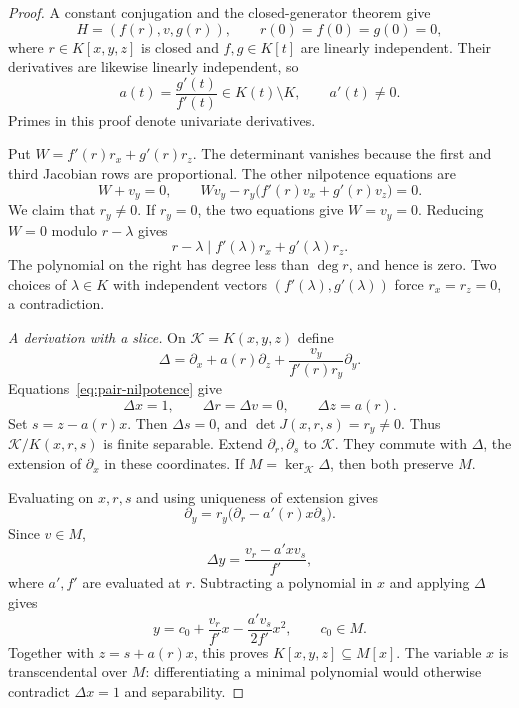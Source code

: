 \documentclass[10pt,a4paper]{amsart}
\begin{document}
\begin{proof}
A constant conjugation and the closed-generator theorem give
\begin{equation}\label{eq:pair-form}
 H=(f(r),v,g(r)),\qquad r(0)=f(0)=g(0)=0,
\end{equation}
where $r\in K[x,y,z]$ is closed and $f,g\in K[t]$ are linearly independent. Their derivatives are likewise linearly independent, so
\begin{equation}\label{eq:a-ratio}
 a(t)=\frac{g'(t)}{f'(t)}\in K(t)\setminus K,\qquad a'(t)\neq0.
\end{equation}
Primes in this proof denote univariate derivatives.

Put $W=f'(r)r_x+g'(r)r_z$. The determinant vanishes because the first and third Jacobian rows are proportional. The other nilpotence equations are
\begin{equation}\label{eq:pair-nilpotence}
 W+v_y=0,\qquad Wv_y-r_y\bigl(f'(r)v_x+g'(r)v_z\bigr)=0.
\end{equation}
We claim that $r_y\neq0$. If $r_y=0$, the two equations give $W=v_y=0$. Reducing $W=0$ modulo $r-\lambda$ gives
\[
 r-\lambda\mid f'(\lambda)r_x+g'(\lambda)r_z.
\]
The polynomial on the right has degree less than $\deg r$, and hence is zero. Two choices of $\lambda\in K$ with independent vectors $(f'(\lambda),g'(\lambda))$ force $r_x=r_z=0$, a contradiction.

\smallskip\noindent\emph{A derivation with a slice.}
On $\mathcal K=K(x,y,z)$ define
\begin{equation}\label{eq:delta}
 \Delta=\partial_x+a(r)\partial_z+\frac{v_y}{f'(r)r_y}\partial_y.
\end{equation}
Equations~\eqref{eq:pair-nilpotence} give
\[
 \Delta x=1,\qquad \Delta r=\Delta v=0,\qquad \Delta z=a(r).
\]
Set $s=z-a(r)x$. Then $\Delta s=0$, and $\det J(x,r,s)=r_y\neq0$. Thus $\mathcal K/K(x,r,s)$ is finite separable. Extend $\partial_r,\partial_s$ to $\mathcal K$. They commute with $\Delta$, the extension of $\partial_x$ in these coordinates. If $M=\ker_{\mathcal K}\Delta$, then both preserve $M$.

Evaluating on $x,r,s$ and using uniqueness of extension gives
\begin{equation}\label{eq:dy-identity}
 \partial_y=r_y\bigl(\partial_r-a'(r)x\partial_s\bigr).
\end{equation}
Since $v\in M$,
\[
 \Delta y=\frac{v_r-a'xv_s}{f'},
\]
where $a',f'$ are evaluated at $r$. Subtracting a polynomial in $x$ and applying $\Delta$ gives
\begin{equation}\label{eq:y-polynomial}
 y=c_0+\frac{v_r}{f'}x-\frac{a'v_s}{2f'}x^2,\qquad c_0\in M.
\end{equation}
Together with $z=s+a(r)x$, this proves $K[x,y,z]\subseteq M[x]$. The variable $x$ is transcendental over $M$: differentiating a minimal polynomial would otherwise contradict $\Delta x=1$ and separability.


\end{proof}
\end{document}
